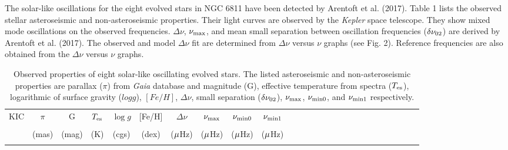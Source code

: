 \documentclass[a4paper,fleqn,usenatbib]{mnras}     %
\begin{document}
{%

The solar-like oscillations for 
the eight evolved stars in NGC 6811
have been detected 
by Arentoft et al. (2017). 
Table 1 lists the observed 
stellar asteroseismic and non-asteroseismic properties.
Their light curves are observed by 
the \textit{Kepler} space telescope. 
They show mixed mode oscillations on the observed frequencies. 
$\Delta\nu$, $\nu_{\rm \max}$, and mean small 
separation between oscillation frequencies 
(${\delta\nu_{\rm 02}}$) are derived by Arentoft et al. (2017). 
The observed and model  $\Delta\nu$
fit are determined from $\Delta\nu$ versus $\nu$ graphs (see Fig. 2).
Reference frequencies are also 
obtained from the $\Delta\nu$ versus $\nu$ graphs.

\begin{table*}
        \caption{Observed properties of eight solar-like oscillating evolved stars. The listed asteroseismic and non-asteroseismic properties are parallax ($\pi$) from {\emph{Gaia}} database and magnitude (G), effective temperature from spectra ($T_{\rm es}$), logarithmic of surface gravity ($log g$), $[Fe/H]$, ${\Delta\nu}$, small separation (${\delta\nu_{\rm 02}}$), ${\nu_{\rm max}}$, ${\nu_{\rm min0}}$, and ${\nu_{\rm min1}}$ respectively.}


        \begin{tabular}{lccccccccccccccccccccccrrr}
                \hline
KIC  &$\pi$&G&$T_{\rm es}$&$\log g$& [Fe/H] &${\Delta\nu}$ &${\nu_{\rm max}}$ & ${\nu_{\rm min0}}$&${\nu_{\rm min1}}$ \\ \\[1.2pt]
              &(mas)&(mag)&(K)&(cgs)&(dex)&(${\rm \mu}$Hz)&(${\rm \mu}$Hz)&(${\rm \mu}$Hz)&(${\rm \mu}$Hz)\\ \\[1.2pt]
  \hline


\end{tabular}
\end{table*}}
\end{document}
